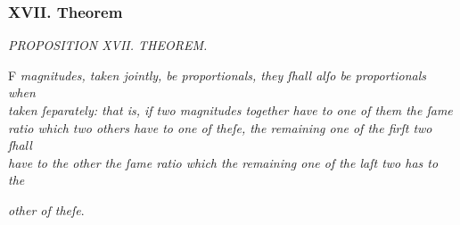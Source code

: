 \documentclass[12pt,preview]{standalone}
\begin{document}
\subsubsection{XVII. Theorem}

\begin{minipage}{\textwidth}

    \begin{center}
        \textit{PROPOSITION XVII. THEOREM.}\label{book5pr17} \\
    \end{center}

    \hfill

    \begin{center}
        \raggedright \lettrine[lines=4, loversize=1, nindent=0pt]{}{}F \textit{magnitudes, taken jointly, be proportionals, they ſhall alſo be proportionals when\\ taken ſeparately: that is, if two magnitudes together have to one of them the ſame\\ ratio which two others have to one of theſe, the remaining one of the firſt two ſhall\\ have to the other the ſame ratio which the remaining one of the laſt two has to the}
    \end{center}
    \textit{other of theſe}.

    \hfill

    \hfill

    \begin{onehalfspacing}


\end{onehalfspacing}
\end{minipage}
\end{document}
